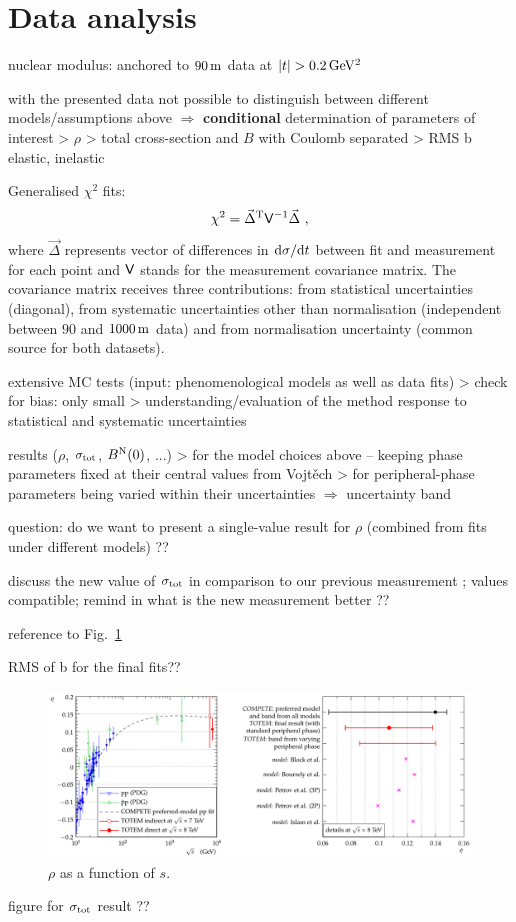 \section{Data analysis}
\label{sec:cni_anal}

\> nuclear modulus: anchored to $90\,{\rm m}$ data at $|t| > 0.2\,{\rm GeV^2}$

\> with the presented data not possible to distinguish between different models/assumptions above $\Rightarrow$ {\bf conditional} determination of parameters of interest
\>> $\rho$
\>> total cross-section and $B$ with Coulomb separated
\>> RMS b elastic, inelastic


Generalised $\chi^2$ fits:
\begin{equation}
\label{eq:chi sq}
	\chi^2 = \vec\Delta^{\rm T} \mathsf{V}^{-1} \vec\Delta\ ,
\end{equation}
where $\vec\Delta$ represents vector of differences in ${\rm d}\sigma/{\rm d} t$ between fit and measurement for each point and $\mathsf{V}$ stands for the measurement covariance matrix. The covariance matrix receives three contributions: from statistical uncertainties (diagonal), from systematic uncertainties other than normalisation (independent between $90$ and $1000\,{\rm m}$ data) and from normalisation uncertainty (common source for both datasets).

\> extensive MC tests (input: phenomenological models as well as data fits)
\>> check for bias: only small
\>> understanding/evaluation of the method response to statistical and systematic uncertainties

\> results ($\rho$, $\sigma_{\rm tot}$, $B^{\rm N}(0)$, ...)
\>> for the model choices above -- keeping phase parameters fixed at their central values from Vojt\v ech
\>> for peripheral-phase parameters being varied within their uncertainties $\Rightarrow$ uncertainty band

\> question: do we want to present a single-value result for $\rho$ (combined from fits under different models) ??

\> discuss the new value of $\sigma_{\rm tot}$ in comparison to our previous measurement \cite{prl111}; values compatible; remind in what is the new measurement better ??

\> reference to Fig.~\ref{fig:rho_s}

\> RMS of b for the final fits??

\begin{figure}
\begin{center}
\includegraphics[width=16cm]{fig/rho_s.pdf}
\vskip-3mm
\caption{$\rho$ as a function of $s$.}
\label{fig:rho_s}
\end{center}
\end{figure}

\> figure for $\sigma_{\rm tot}$ result ?? 

